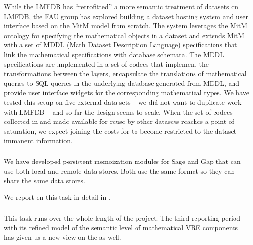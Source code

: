 While the LMFDB has ``retrofitted'' a more semantic treatment of datasets on LMFDB, the FAU group has explored building a dataset hosting system and user interface based on the MitM model from scratch.
The \dmh system leverages the MitM ontology for specifying the mathematical objects in a dataset and extends MitM with a set of MDDL (Math Dataset Description Language) specifications that link the mathematical specifications with database schemata.
The MDDL specifications are implemented in a set of codecs that implement the transformations between the layers, encapsulate the translations of mathematical queries to SQL queries in the underlying database generated from MDDL, and provide user interface widgets for the corresponding mathematical types.
We have tested this setup on five external data sets -- we did not want to duplicate work with LMFDB -- and so far the \dmh design seems to scale.
When the set of codecs collected in \dmh and made available for reuse by other datasets reaches a point of saturation, we expect joining the costs for \dmh to become restricted to the dataset-immanent information.
\medskip

\subparagraph{}
\label{dksbases@data-memo}
We have developed persistent memoization modules for Sage and Gap that can use both local and remote data stores.
Both use the same format so they can share the same data stores.

We report on this task in detail in .
\medskip

\subparagraph{}
This task runs over the whole length of the \pn project. The third reporting period with its refined model of the semantic level of mathematical VRE components has given us a new view on the  as well.

